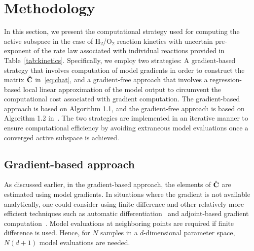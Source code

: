 \section{Methodology}
\label{sec:method}

In this section, we present the computational strategy used for computing the
active subspace in the case of H$_2$/O$_2$ reaction kinetics with uncertain
pre-exponent of the rate law associated with individual reactions provided in
Table~\ref{tab:kinetics}.
Specifically, we employ two strategies: 
A gradient-based strategy that involves computation of model
gradients in order to construct the matrix $\hat{\mathbf{{C}}}$
in~\eqref{eq:chat}, and a gradient-free approach 
that involves a regression-based local linear approximation of
the model output to circumvent the computational cost associated with gradient
computation. 
The gradient-based approach is based on Algorithm
1.1, and the gradient-free approach is based on Algorithm 1.2
in~\cite{Constantine:2015}. The two strategies are implemented in an
iterative manner to ensure computational efficiency by avoiding 
extraneous model evaluations once a converged active subspace
is achieved. 

\subsection{Gradient-based approach}
\label{sub:grad}

As discussed earlier, in the gradient-based approach, the elements of
$\hat{\mathbf{{C}}}$ are estimated using model gradients.  In situations where the
gradient is not available analytically, one could consider using finite
difference and other relatively more efficient techniques such as automatic
differentiation~\cite{Kiparissides:2009} and adjoint-based gradient
computation~\cite{Jameson:1988,Gunzburger:2003,Borzi:2011,Alexanderian:2017}.
Model evaluations at neighboring points are required if finite difference is
used. Hence, for $N$ samples in a $d$-dimensional parameter space, $N(d+1)$
model evaluations are needed. 

